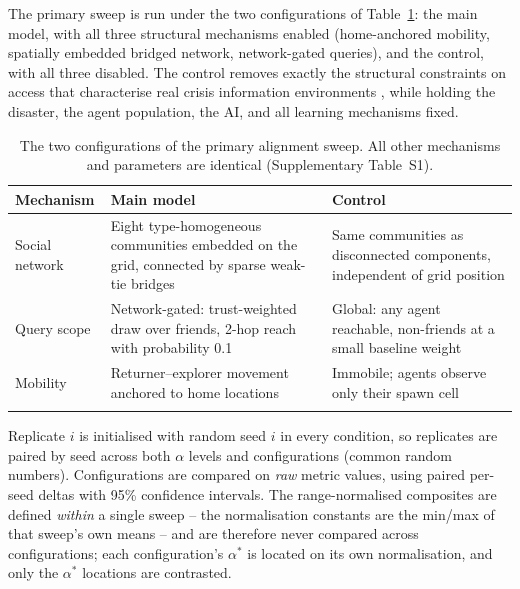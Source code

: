 \documentclass[pdflatex,sn-basic]{sn-jnl}
\begin{document}
The primary sweep is run under the two configurations of Table~\ref{tab:configs}: the main model, with all three structural mechanisms enabled (home-anchored mobility, spatially embedded bridged network, network-gated queries), and the control, with all three disabled. The control removes exactly the structural constraints on access that characterise real crisis information environments \citep{pan2012crisis,holguin2012unique}, while holding the disaster, the agent population, the AI, and all learning mechanisms fixed.

\begin{table}[h]
\caption{The two configurations of the primary alignment sweep. All other mechanisms and parameters are identical (Supplementary Table~S1).}\label{tab:configs}
\begin{tabular}{@{}p{3.2cm}p{4.6cm}p{4.6cm}@{}}
\toprule
Mechanism & Main model & Control \\
\midrule
Social network & Eight type-homogeneous communities embedded on the grid, connected by sparse weak-tie bridges & Same communities as disconnected components, independent of grid position \\
Query scope & Network-gated: trust-weighted draw over friends, 2-hop reach with probability 0.1 & Global: any agent reachable, non-friends at a small baseline weight \\
Mobility & Returner--explorer movement anchored to home locations \citep{pappalardo2015returners} & Immobile; agents observe only their spawn cell \\
\botrule
\end{tabular}
\end{table} Replicate $i$ is initialised with random seed $i$ in every condition, so replicates are paired by seed across both $\alpha$ levels and configurations (common random numbers). Configurations are compared on \emph{raw} metric values, using paired per-seed deltas with 95\% confidence intervals. The range-normalised composites are defined \emph{within} a single sweep -- the normalisation constants are the min/max of that sweep's own means -- and are therefore never compared across configurations; each configuration's $\alpha^{*}$ is located on its own normalisation, and only the $\alpha^{*}$ locations are contrasted.
\end{document}
